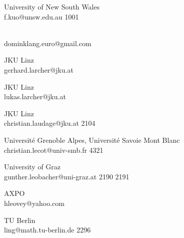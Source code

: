 \begin{multicols}{2}
 {University of New South Wales\\}%
 {f.kuo@unsw.edu.au}%
 {1001} %
 {} %
 {} %
 {} %
 {} %

 {\ \\}%
 {dominklang.euro@gmail.com}%
 {} %
 {} %
 {} %
 {} %
 {} %

 {JKU Linz\\}%
 {gerhard.larcher@jku.at}%
 {} %
 {} %
 {} %
 {} %
 {} %

 {JKU Linz\\}%
 {lukas.larcher@jku.at}%
 {} %
 {} %
 {} %
 {} %
 {} %

 {JKU Linz\\}%
 {christian.laudage@jku.at}%
 {2104} %
 {} %
 {} %
 {} %
 {} %

 {Universit\'e Grenoble Alpes, Universit\'e Savoie Mont Blanc\\}%
 {christian.lecot@univ-smb.fr}%
 {4321} %
 {} %
 {} %
 {} %
 {} %

 {University of Graz\\}%
 {gunther.leobacher@uni-graz.at}%
 {2190} %
 {2191} %
 {} %
 {} %
 {} %

 {AXPO\\}%
 {hleovey@yahoo.com}%
 {} %
 {} %
 {} %
 {} %
 {} %

 {TU Berlin\\}%
 {ling@math.tu-berlin.de}%
 {2296} %
 {} %
 {} %
 {} %
 {} %


\end{multicols}
